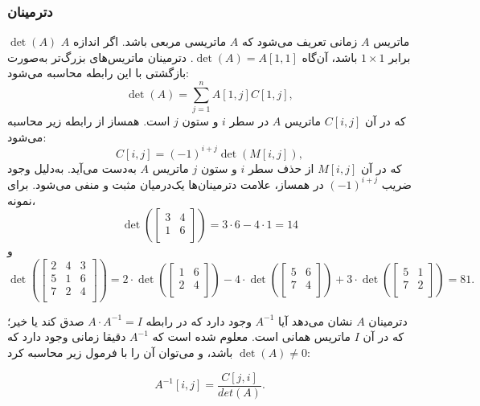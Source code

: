 \subsubsection{دترمینان}


 $\det(A)$ ماتریس $A$
زمانی تعریف می‌شود که $A$ ماتریسی مربعی باشد.
اگر اندازه $A$ برابر $1 \times 1$ باشد،
آن‌گاه $\det(A)=A[1,1]$.
دترمینان ماتریس‌های بزرگ‌تر
به‌صورت بازگشتی با این رابطه محاسبه می‌شود: 
\[\det(A)=\sum_{j=1}^n A[1,j] C[1,j],\]
که در آن $C[i,j]$  ماتریس $A$
در سطر $i$ و ستون $j$ است.
همساز از رابطه زیر محاسبه می‌شود:
\[C[i,j] = (-1)^{i+j} \det(M[i,j]),\]
که در آن $M[i,j]$ از حذف سطر $i$
و ستون $j$ ماتریس $A$ به‌دست می‌آید.
به‌دلیل وجود ضریب $(-1)^{i+j}$ در همساز،
علامت دترمینان‌ها یک‌درمیان مثبت
و منفی می‌شود.
برای نمونه،
\[
\det(
 \begin{bmatrix}
  3 & 4 \\
  1 & 6 \\
 \end{bmatrix}
) = 3 \cdot 6 - 4 \cdot 1 = 14 
\]
و
\[
\det(
 \begin{bmatrix}
  2 & 4 & 3 \\
  5 & 1 & 6 \\
  7 & 2 & 4 \\
 \end{bmatrix}
) = 
2 \cdot
\det(
 \begin{bmatrix}
  1 & 6 \\
  2 & 4 \\
 \end{bmatrix}
)
-4 \cdot
\det(
 \begin{bmatrix}
  5 & 6 \\
  7 & 4 \\
 \end{bmatrix}
)
+3 \cdot
\det(
 \begin{bmatrix}
  5 & 1 \\
  7 & 2 \\
 \end{bmatrix}
) = 81.
\]


دترمینان $A$ نشان می‌دهد
آیا  $A^{-1}$ وجود دارد
که در رابطه $A \cdot A^{-1} = I$ صدق کند یا خیر؛
که در آن $I$ ماتریس همانی است.
معلوم شده است که $A^{-1}$ دقیقا زمانی وجود دارد
که $\det(A) \neq 0$ باشد،
و می‌توان آن را با فرمول زیر محاسبه کرد:

\[A^{-1}[i,j] = \frac{C[j,i]}{det(A)}.\]

